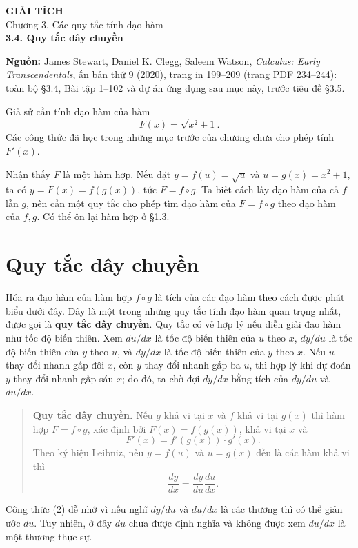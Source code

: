 \documentclass[12pt,a4paper]{article}
\begin{document}
\begin{center}
{\Large\bfseries GIẢI TÍCH}\\[5pt]
{\large Chương 3. Các quy tắc tính đạo hàm}\\[9pt]
{\Large\bfseries 3.4. Quy tắc dây chuyền}
\end{center}
\noindent\textbf{Nguồn:} James Stewart, Daniel K. Clegg, Saleem Watson, \textit{Calculus: Early Transcendentals}, ấn bản thứ 9 (2020), trang in 199–209 (trang PDF 234–244): toàn bộ §3.4, Bài tập 1–102 và dự án ứng dụng sau mục này, trước tiêu đề §3.5.

Giả sử cần tính đạo hàm của hàm
\[F(x)=\sqrt{x^2+1}.\]
Các công thức đã học trong những mục trước của chương chưa cho phép tính $F'(x)$.

Nhận thấy $F$ là một hàm hợp. Nếu đặt $y=f(u)=\sqrt u$ và $u=g(x)=x^2+1$, ta có $y=F(x)=f(g(x))$, tức $F=f\circ g$. Ta biết cách lấy đạo hàm của cả $f$ lẫn $g$, nên cần một quy tắc cho phép tìm đạo hàm của $F=f\circ g$ theo đạo hàm của $f,g$. Có thể ôn lại hàm hợp ở §1.3.
\section*{Quy tắc dây chuyền}
Hóa ra đạo hàm của hàm hợp $f\circ g$ là tích của các đạo hàm theo cách được phát biểu dưới đây. Đây là một trong những quy tắc tính đạo hàm quan trọng nhất, được gọi là \textbf{quy tắc dây chuyền}. Quy tắc có vẻ hợp lý nếu diễn giải đạo hàm như tốc độ biến thiên. Xem $du/dx$ là tốc độ biến thiên của $u$ theo $x$, $dy/du$ là tốc độ biến thiên của $y$ theo $u$, và $dy/dx$ là tốc độ biến thiên của $y$ theo $x$. Nếu $u$ thay đổi nhanh gấp đôi $x$, còn $y$ thay đổi nhanh gấp ba $u$, thì hợp lý khi dự đoán $y$ thay đổi nhanh gấp sáu $x$; do đó, ta chờ đợi $dy/dx$ bằng tích của $dy/du$ và $du/dx$.
\begin{quote}\textbf{Quy tắc dây chuyền.} Nếu $g$ khả vi tại $x$ và $f$ khả vi tại $g(x)$ thì hàm hợp $F=f\circ g$, xác định bởi $F(x)=f(g(x))$, khả vi tại $x$ và
\[F'(x)=f'(g(x))\cdot g'(x).\tag{1}\]
Theo ký hiệu Leibniz, nếu $y=f(u)$ và $u=g(x)$ đều là các hàm khả vi thì
\[\frac{dy}{dx}=\frac{dy}{du}\frac{du}{dx}.\tag{2}\]
\end{quote}
Công thức (2) dễ nhớ vì nếu nghĩ $dy/du$ và $du/dx$ là các thương thì có thể giản ước $du$. Tuy nhiên, ở đây $du$ chưa được định nghĩa và không được xem $du/dx$ là một thương thực sự.
\end{document}
